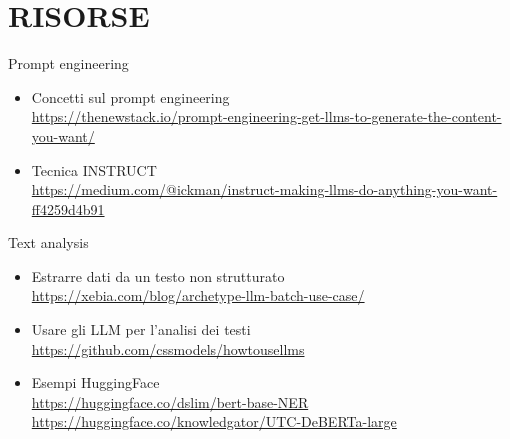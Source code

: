 \documentclass[5pt]{article}
\begin{document}
	\section{RISORSE}
	Prompt engineering
	\begin{itemize}
		\item Concetti sul prompt engineering\\ \url{https://thenewstack.io/prompt-engineering-get-llms-to-generate-the-content-you-want/}
		\item Tecnica INSTRUCT\\ \url{https://medium.com/@ickman/instruct-making-llms-do-anything-you-want-ff4259d4b91}
	\end{itemize}
	
	Text analysis
	\begin{itemize}
		\item Estrarre dati da un testo non strutturato\\ \url{https://xebia.com/blog/archetype-llm-batch-use-case/}
		\item Usare gli LLM per l'analisi dei testi\\ \url{https://github.com/cssmodels/howtousellms}
		\item Esempi HuggingFace\\ \url{https://huggingface.co/dslim/bert-base-NER}\\ \url{https://huggingface.co/knowledgator/UTC-DeBERTa-large}
	\end{itemize}
	
\end{document}
